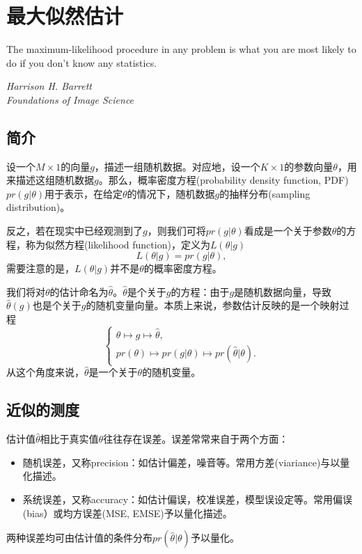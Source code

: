 
\chapter{最大似然估计}
\label{sec:mle}

\epigraph{The maximum-likelihood procedure in any problem is what you are most likely to do if you don’t know any statistics.}{\textit{Harrison H. Barrett \\ Foundations of Image Science}}

\section{简介}
\label{sec:mle-intro}
设一个$M \times 1$的向量$g$，描述一组随机数据。对应地，设一个$K \times 1$的参数向量$\theta$，用来描述这组随机数据$g$。那么，概率密度方程(probability density function, PDF) $pr(g|\theta)$用于表示，在给定$\theta$的情况下，随机数据$g$的抽样分布(sampling distribution)。

反之，若在现实中已经观测到了$g$，则我们可将$pr(g|\theta)$看成是一个关于参数$\theta$的方程，称为似然方程(likelihood function)，定义为$L(\theta | g)$
\begin{equation*}
  L(\theta | g) = pr(g | \theta),
\end{equation*}
需要注意的是，$L(\theta | g)$并不是$\theta$的概率密度方程。

我们将对$\theta$的估计命名为$\hat{\theta}$。$\hat{\theta}$是个关于$g$的方程：由于$g$是随机数据向量，导致$\hat{\theta}(g)$也是个关于$g$的随机变量向量。本质上来说，参数估计反映的是一个映射过程
\begin{equation*}
  \begin{cases}
    \theta \mapsto g \mapsto \hat{\theta}, \\
    pr(\theta) \mapsto pr(g | \theta) \mapsto pr(\hat{\theta} | \theta).
  \end{cases}
\end{equation*}
从这个角度来说，$\hat{\theta}$是一个关于$\theta$的随机变量。

\section{近似的测度}
\label{sec:mle-performance-metrics}
估计值$\hat{\theta}$相比于真实值$\theta$往往存在误差。误差常常来自于两个方面：
\begin{itemize}
  \item 随机误差，又称precision：如估计偏差，噪音等。常用方差(viariance)与以量化描述。
  \item 系统误差，又称accuracy：如估计偏误，校准误差，模型误设定等。常用偏误(bias）或均方误差(MSE, EMSE)予以量化描述。
\end{itemize}
两种误差均可由估计值的条件分布$pr(\hat{\theta} | \theta)$予以量化。



